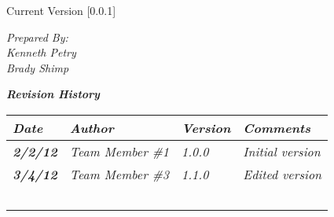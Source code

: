 


Current Version [0.0.1]
\vspace*{5mm}

{\color{SDColor5}
\noindent
\textit{Prepared By:}\\
\textit{Kenneth Petry}\\
\textit{Brady Shimp}\\
}

\vfill
\noindent
{\color{SDColor3} \textit{\textbf{Revision History}}}\\
\begin{tabular}{|>{\raggedright}p{1.5cm}|>{\raggedright}p{3cm}|>{\raggedright}p{1.5cm}|>{\raggedright}p{9cm}|}
\hline
\textit{\textbf{Date}} &  \textit{\textbf{Author}} & \textit{\textbf{Version}} & \textit{\textbf{Comments}}\tabularnewline
\hline
 \textit{\textbf{2/2/12}} & \textit{Team Member \#1} & \textit{1.0.0} & \textit{Initial version}\tabularnewline
\hline
\textit{\textbf{3/4/12}} & \textit{Team Member \#3} & \textit{1.1.0} & \textit{Edited version}\tabularnewline
\hline
 &  &  & \tabularnewline
 \hline
 &  &  & \tabularnewline
\hline
 &  &  & \tabularnewline
\hline
 &  &  & \tabularnewline
\hline
 &  &  & \tabularnewline
\hline
\end{tabular}
\vfill

